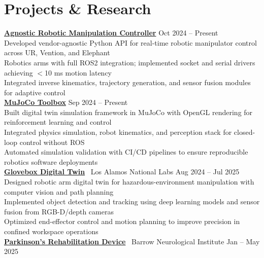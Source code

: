 \documentclass[10pt]{article}
\begin{document}
\section*{Projects \& Research}
\textbf{\href{https://github.com/MGross21/armctl}{Agnostic Robotic Manipulation Controller}} \hfill Oct 2024 -- Present \\
\hspace*{2em}Developed vendor-agnostic Python API for real-time robotic manipulator control across UR, Vention, and Elephant \\
\hspace*{2em}Robotics arms with full ROS2 integration; implemented socket and serial drivers achieving $<$10 ms motion latency \\
\hspace*{2em}Integrated inverse kinematics, trajectory generation, and sensor fusion modules for adaptive control
\\
\textbf{\href{https://github.com/MGross21/mujoco-toolbox}{MuJoCo Toolbox}} \hfill Sep 2024 -- Present \\
\hspace*{2em}Built digital twin simulation framework in MuJoCo with OpenGL rendering for reinforcement learning and control \\
\hspace*{2em}Integrated physics simulation, robot kinematics, and perception stack for closed-loop control without ROS \\
\hspace*{2em}Automated simulation validation with CI/CD pipelines to ensure reproducible robotics software deployments
\\
\textbf{\href{https://github.com/MGross21/glovebox-digitaltwin}{Glovebox Digital Twin}} \textbar\ Los Alamos National Labs \hfill Aug 2024 -- Jul 2025 \\
\hspace*{2em}Designed robotic arm digital twin for hazardous-environment manipulation with computer vision and path planning \\
\hspace*{2em}Implemented object detection and tracking using deep learning models and sensor fusion from RGB-D/depth cameras \\
\hspace*{2em}Optimized end-effector control and motion planning to improve precision in confined workspace operations
\\
\textbf{\href{https://github.com/MGross21/syncstride-wearable}{Parkinson's Rehabilitation Device}} \textbar\ Barrow Neurological Institute \hfill Jan -- May 2025 \\
\end{document}
